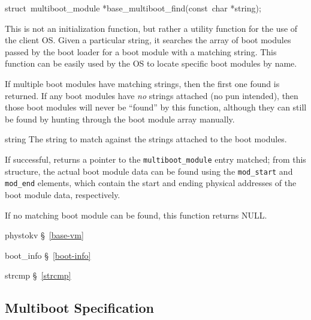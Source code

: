 \label{base-multiboot-find}
\begin{apisyn}

	\funcproto struct~multiboot_module *base_multiboot_find(const~char
								*string);
\end{apisyn}
\begin{apidesc}
	This is not an initialization function,
	but rather a utility function for the use of the client OS\@.
	Given a particular string,
	it searches the array of boot modules passed by the boot loader
	for a boot module with a matching string.
	This function can be easily used by the OS
	to locate specific boot modules by name.

	If multiple boot modules have matching strings,
	then the first one found is returned.
	If any boot modules have \emph{no} strings attached
	(no pun intended),
	then those boot modules will never be ``found'' by this function,
	although they can still be found
	by hunting through the boot module array manually.
\end{apidesc}
\begin{apiparm}
	\item[string]
		The string to match against the strings
		attached to the boot modules.
\end{apiparm}
\begin{apiret}
	If successful,
	returns a pointer to the {\tt multiboot_module} entry matched;
	from this structure, the actual boot module data can be found
	using the {\tt mod_start} and {\tt mod_end} elements,
	which contain the start and ending physical addresses
	of the boot module data, respectively.

	If no matching boot module can be found,
	this function returns NULL.
\end{apiret}
\begin{apidep}
	\item[phystokv]		\S~\ref{base-vm}
	\item[boot_info]	\S~\ref{boot-info}
	\item[strcmp]		\S~\ref{strcmp}
\end{apidep}

\subsection{Multiboot Specification}
\label{multiboot-spec}




